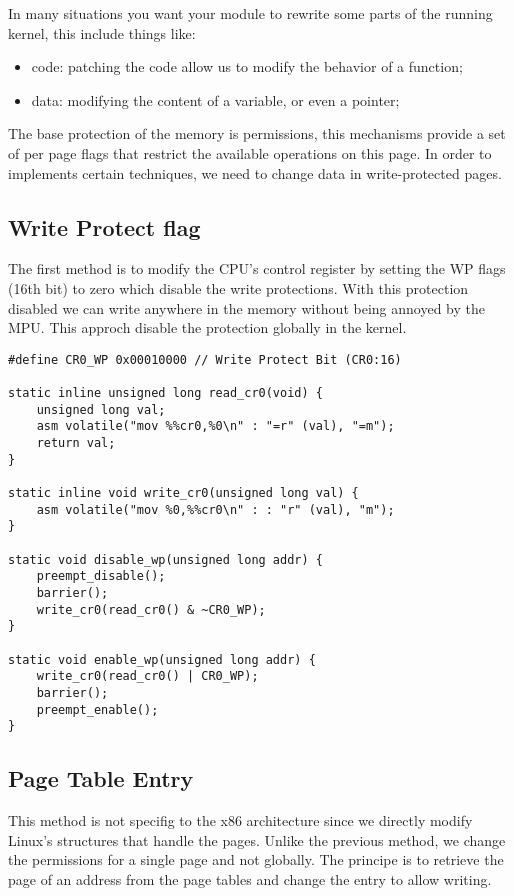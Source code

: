 In many situations you want your module to rewrite some parts of the running
kernel, this include things like:
\begin{itemize}
  \item code: patching the code allow us to modify the behavior of a function;
  \item data: modifying the content of a variable, or even a pointer;
\end{itemize}
The base protection of the memory is permissions, this mechanisms provide a
set of per page flags that restrict the available operations on this page.
In order to implements certain techniques, we need to change data in
write-protected pages.

\subsection{Write Protect flag}
The first method is to modify the CPU's control register by setting the
WP flags (16th bit) to zero which disable the write protections.
With this protection disabled we can write anywhere in the memory without being
annoyed by the MPU. This approch disable the protection globally in the kernel.
\cite{wp_safe}

\begin{lstlisting}[frame=single]
#define CR0_WP 0x00010000 // Write Protect Bit (CR0:16)

static inline unsigned long read_cr0(void) {
    unsigned long val;
    asm volatile("mov %%cr0,%0\n" : "=r" (val), "=m");
    return val;
}

static inline void write_cr0(unsigned long val) {
    asm volatile("mov %0,%%cr0\n" : : "r" (val), "m");
}

static void disable_wp(unsigned long addr) {
    preempt_disable();
    barrier();
    write_cr0(read_cr0() & ~CR0_WP);
}

static void enable_wp(unsigned long addr) {
    write_cr0(read_cr0() | CR0_WP);
    barrier();
    preempt_enable();
}
\end{lstlisting}

\subsection{Page Table Entry}
\cite{kernel_memory}
This method is not specifig to the x86 architecture since we directly modify
Linux's structures that handle the pages. Unlike the previous method, we
change the permissions for a single page and not globally.
The principe is to retrieve the page of an address from the page tables and
change the entry to allow writing.

